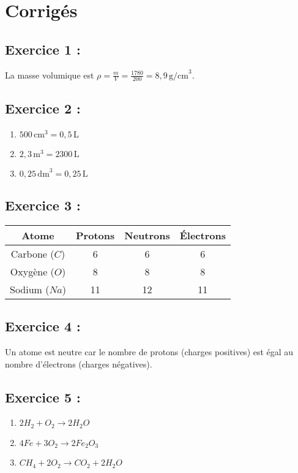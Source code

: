 \documentclass[a4paper,12pt]{article}
\begin{document}
\section{Corrigés}

\subsection*{Exercice 1 :}
La masse volumique est \( \rho = \frac{m}{V} = \frac{1780}{200} = 8,9 \, \text{g/cm}^3 \).

\subsection*{Exercice 2 :}
\begin{enumerate}
    \item \( 500 \, \text{cm}^3 = 0,5 \, \text{L} \)
    \item \( 2,3 \, \text{m}^3 = 2300 \, \text{L} \)
    \item \( 0,25 \, \text{dm}^3 = 0,25 \, \text{L} \)
\end{enumerate}

\subsection*{Exercice 3 :}
\begin{tabular}{|c|c|c|c|}
\hline
Atome & Protons & Neutrons & Électrons \\
\hline
Carbone (\( C \)) & 6 & 6 & 6 \\
\hline
Oxygène (\( O \)) & 8 & 8 & 8 \\
\hline
Sodium (\( Na \)) & 11 & 12 & 11 \\
\hline
\end{tabular}

\subsection*{Exercice 4 :}
Un atome est neutre car le nombre de protons (charges positives) est égal au nombre d'électrons (charges négatives).

\subsection*{Exercice 5 :}
\begin{enumerate}
    \item \( 2H_2 + O_2 \rightarrow 2H_2O \)
    \item \( 4Fe + 3O_2 \rightarrow 2Fe_2O_3 \)
    \item \( CH_4 + 2O_2 \rightarrow CO_2 + 2H_2O \)
\end{enumerate}
\end{document}
